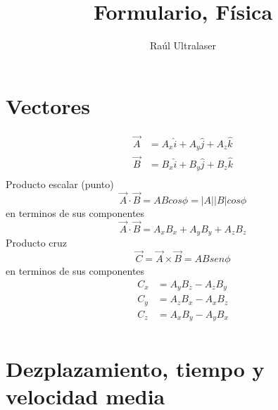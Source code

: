 \documentclass[twocolumn]{article}
\title{Formulario, Física}
\author{Raúl Ultralaser}
\date{}
\begin{document}
\maketitle

\section{Vectores}
\begin{align*}
\vec{A}&=A_x\hat{i}+A_y\hat{j}+A_z\hat{k}\\
\vec{B}&=B_x\hat{i}+B_y\hat{j}+B_z\hat{k}\\
\end{align*}
Producto escalar (punto)
\begin{equation*}
    \Vec{A}\cdot \Vec{B}=ABcos\phi=|A||B|cos\phi
\end{equation*}
en terminos de sus componentes
\begin{equation*}
    \Vec{A}\cdot \Vec{B}=A_xB_x+A_yB_y+A_zB_z
\end{equation*}
Producto cruz
\begin{equation*}
    \Vec{C}=\Vec{A}\times\Vec{B}=ABsen\phi
\end{equation*}
en terminos de sus componentes
\begin{align*}
C_x&=A_yB_z-A_zB_y\\
C_y&=A_zB_x-A_xB_z\\
C_z&=A_xB_y-A_yB_x\\
\end{align*}
\section{Dezplazamiento, tiempo y velocidad media}
\end{document}
